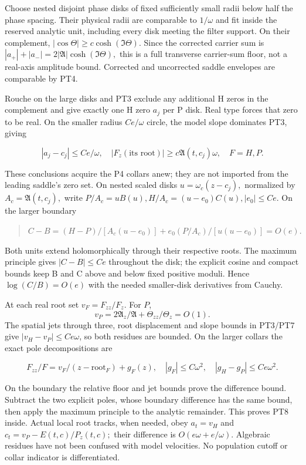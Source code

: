 Choose nested disjoint phase disks of fixed sufficiently small radii below half the phase spacing. Their physical radii are comparable to \(1/\omega\) and fit inside the reserved analytic unit, including every disk meeting the filter support. On their complement, \(|\cos\Theta|\ge c \cosh(\Im\Theta).\) Since the corrected carrier sum is \(|a_+|+|a_-|=2|\mathfrak A|\cosh(\Im\Theta),\) this is a full transverse carrier-sum floor, not a real-axis amplitude bound. Corrected and uncorrected saddle envelopes are comparable by PT4.

Rouche on the large disks and PT3 exclude any additional H zeros in the complement and give exactly one H zero \(a_{j}\) per P disk. Real type forces that zero to be real. On the smaller radius \(C e/\omega\) circle, the model slope dominates PT3, giving

\[
|a_j-c_j|\le Ce/\omega,\quad
|F_z(\text{its root})|\ge c\mathfrak A(t,c_j)\omega,
\quad F=H,P.
\tag{PT7}\label{eq:ansatz-pt7}
\]

These conclusions acquire the P4 collars anew; they are not imported from the leading saddle's zero set. On nested scaled disks \(u=\omega_{c}(z-c_{j}),\) normalized by \(A_{c}=\mathfrak A(t,c_{j}),\) write \(P/A_{c}=u B(u), H/A_{c}=(u-e_{0})C(u), |e_{0}|\le Ce.\) On the larger boundary

\begin{quote}\small
\(C-B=(H-P)/[A_{c}(u-e_{0})]+e_{0}(P/A_{c})/[u(u-e_{0})]=O(e).\)\par
\end{quote}
Both units extend holomorphically through their respective roots. The maximum principle gives \(|C-B|\le Ce\) throughout the disk; the explicit cosine and compact bounds keep B and C above and below fixed positive moduli. Hence \(\log(C/B)=O(e)\) with the needed smaller-disk derivatives from Cauchy.

At each real root set $v_F=F_{zz}/F_z$. For $P$,
\[
 v_P=2\mathfrak A_z/\mathfrak A+\Theta_{zz}/\Theta_z=O(1).
\]
The spatial jets through three, root displacement and slope bounds in
PT3/PT7 give $|v_H-v_P|\le Ce\omega$, so both residues are bounded.
On the larger collars the exact pole decompositions are

\[
F_{zz}/F=v_F/(z-\text{root}_F)+g_F(z),\quad
|g_F|\le C\omega^2,\quad |g_H-g_P|\le Ce\omega^2.
\tag{PT8}\label{eq:ansatz-pt8}
\]

On the boundary the relative floor and jet bounds prove the difference bound. Subtract the two explicit poles, whose boundary difference has the same bound, then apply the maximum principle to the analytic remainder. This proves PT8 inside. Actual local root tracks, when needed, obey \(a_{t}=v_{H}\) and \(c_{t}=v_{P}-E(t,c)/P_{z}(t,c);\) their difference is \(O(e \omega+e/\omega).\) Algebraic residues have not been confused with model velocities. No population cutoff or collar indicator is differentiated.

